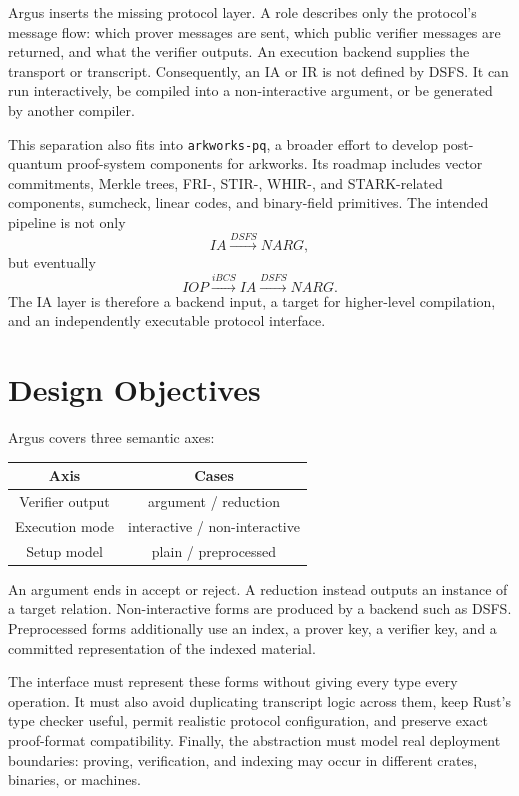 \documentclass[11pt]{article}
\begin{document}
Argus inserts the missing protocol layer. A role describes only the protocol's
message flow: which prover messages are sent, which public verifier messages
are returned, and what the verifier outputs. An execution
backend supplies the transport or transcript. Consequently, an IA or IR is not
defined by DSFS. It can run interactively, be compiled into a non-interactive
argument, or be generated by another compiler.

This separation also fits into \texttt{arkworks-pq}, a broader effort to
develop post-quantum proof-system components for arkworks. Its roadmap includes
vector commitments, Merkle trees, FRI-, STIR-, WHIR-, and STARK-related
components, sumcheck, linear codes, and binary-field primitives. The intended
pipeline is not only
\[
    IA \xrightarrow{DSFS} NARG,
\]
but eventually
\[
    IOP \xrightarrow{iBCS} IA \xrightarrow{DSFS} NARG.
\]
The IA layer is therefore a backend input, a target for higher-level
compilation, and an independently executable protocol interface.

\section{Design Objectives}

Argus covers three semantic axes:

\begin{center}
\begin{tabular}{c|c}
Axis & Cases \\
\hline
Verifier output & argument / reduction \\
Execution mode & interactive / non-interactive \\
Setup model & plain / preprocessed
\end{tabular}
\end{center}

An argument ends in accept or reject. A reduction instead outputs an instance
of a target relation. Non-interactive forms are produced by a backend such as
DSFS. Preprocessed forms additionally use an index, a prover key, a verifier
key, and a committed representation of the indexed material.

The interface must represent these forms without giving every type every
operation. It must also avoid duplicating transcript logic across them, keep
Rust's type checker useful, permit realistic protocol configuration, and
preserve exact proof-format compatibility. Finally, the abstraction must model
real deployment boundaries: proving, verification, and indexing may occur in
different crates, binaries, or machines.
\end{document}
